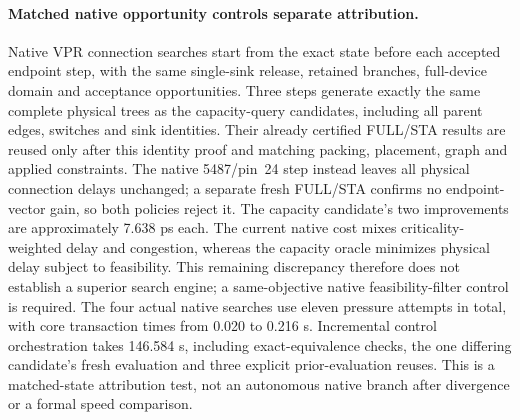 \paragraph{Matched native opportunity controls separate attribution.}
Native VPR connection searches start from the exact state before each accepted endpoint step, with the same single-sink release, retained branches, full-device domain and acceptance opportunities. Three steps generate exactly the same complete physical trees as the capacity-query candidates, including all parent edges, switches and sink identities. Their already certified FULL/STA results are reused only after this identity proof and matching packing, placement, graph and applied constraints. The native 5487/pin~24 step instead leaves all physical connection delays unchanged; a separate fresh FULL/STA confirms no endpoint-vector gain, so both policies reject it. The capacity candidate's two improvements are approximately 7.638 ps each. The current native cost mixes criticality-weighted delay and congestion, whereas the capacity oracle minimizes physical delay subject to feasibility. This remaining discrepancy therefore does not establish a superior search engine; a same-objective native feasibility-filter control is required. The four actual native searches use eleven pressure attempts in total, with core transaction times from 0.020 to 0.216 s. Incremental control orchestration takes 146.584 s, including exact-equivalence checks, the one differing candidate's fresh evaluation and three explicit prior-evaluation reuses. This is a matched-state attribution test, not an autonomous native branch after divergence or a formal speed comparison.
